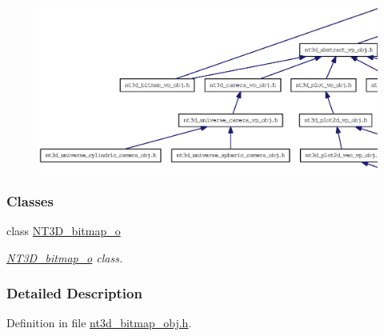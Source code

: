 \begin{figure}[H]
\begin{center}
\leavevmode
\includegraphics[width=400pt]{nt3d__bitmap__obj_8h__dep__incl}
\end{center}
\end{figure}
\subsubsection*{Classes}
\begin{DoxyCompactItemize}
\item 
class \hyperlink{class_n_t3_d__bitmap__o}{NT3D\_\-bitmap\_\-o}
\begin{DoxyCompactList}\small\item\em \hyperlink{class_n_t3_d__bitmap__o}{NT3D\_\-bitmap\_\-o} class. \item\end{DoxyCompactList}\end{DoxyCompactItemize}


\subsubsection{Detailed Description}


Definition in file \hyperlink{nt3d__bitmap__obj_8h_source}{nt3d\_\-bitmap\_\-obj.h}.

